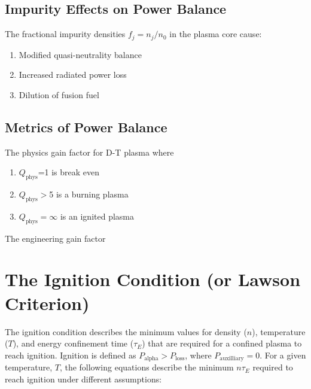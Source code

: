 \subsection{Impurity Effects on Power Balance}
The fractional impurity densities $f_j=n_j/n_0$ in the plasma core cause:
\begin{enumerate}
  \item{Modified quasi-neutrality balance 
    }
  \item{Increased radiated power loss~~\cite{authors}
    }
  \item{Dilution of fusion fuel~~\cite{authors}
    }
\end{enumerate}

\subsection{Metrics of Power Balance}

\noindent
The physics gain factor for D-T plasma 
\indent
where
\begin{enumerate}
  \item{$Q_\mathrm{phys}$=1 is break even}
  \item{$Q_\mathrm{phys}>$5 is a burning plasma}
  \item{$Q_\mathrm{phys}=\infty$ is an ignited plasma}
\end{enumerate}

\noindent
The engineering gain factor~~\cite{authors}


\section{The Ignition Condition (or Lawson Criterion)}
The ignition condition describes the minimum values for density ($n$),
temperature ($T$), and energy confinement time ($\tau_E$) that are
required for a confined plasma to reach ignition.  Ignition is defined
as $P_\mathrm{alpha} > P_{\mathrm{loss}}$, where
$P_{\mathrm{auxilliary}} = 0$.  For a given
temperature, $T$, the following equations describe the minimum
$n\tau_E$ required to reach ignition under different assumptions:

